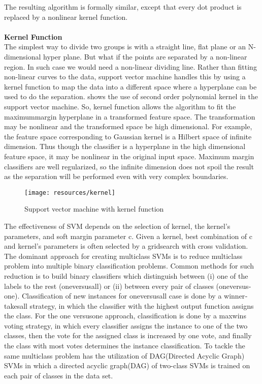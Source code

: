 {The resulting algorithm is formally similar, except that every dot product is replaced by a nonlinear kernel 
function.\\
\\
\textbf{Kernel Function}\\
The simplest way to divide two groups is with a straight line, flat plane or an N-dimensional hyper plane.
But what if the points are separated by a non-linear region. In such case we would need a non-linear dividing line. Rather than fitting
non-linear curves to the data, support vector machine handles this by using a kernel function to map the data into a different space where
a hyperplane can be used to do the separation. \cite{Anglade2010} shows the use of second order polynomial kernel in the support vector machine.
So, kernel function allows the algorithm to fit the maximum­margin hyperplane in a transformed
feature space. The transformation may be nonlinear and the transformed space be high dimensional. For example, the 
feature space corresponding to Gaussian kernel is a Hilbert space of infinite dimension. Thus though the 
classifier is a hyperplane in the high dimensional feature space, it may be nonlinear in the original input 
space. Maximum margin classifiers are well regularized, so the infinite dimension does not spoil the 
result as the separation will be performed even with very complex boundaries.\\

\begin{figure}[h]
        \texttt{[image: resources/kernel]}
        \caption{Support vector machine with kernel function}
\end{figure}
\vspace{15mm}
The effectiveness of SVM depends on the selection of kernel, the kernel’s parameters, and soft 
margin parameter c. Given a kernel, best combination of c and kernel’s parameters is often selected by a 
grid­search with cross validation. 
The dominant approach for creating multiclass SVMs is to reduce multi­class problem into 
multiple binary classification problems. Common methods for such reduction is to build binary classifiers 
which distinguish between (i) one of the labels to the rest (one­versus­all) or (ii) between every pair of 
classes (one­versus­one). Classification of new instances for one­versus­all case is done by a 
winner­takes­all strategy, in which the classifier with the highest output function assigns the class. For the 
one ­versus­one approach, classification is done by a max­wins voting strategy, in which every classifier 
assigns the instance to one of the two classes, then the vote for the assigned class is increased by one vote, 
and finally the class with most votes determines the instance classification. To tackle the same multiclass problem \cite{Haggblade2011} has the  
utilization of DAG(Directed Acyclic Graph) SVMs in which a directed acyclic graph(DAG) of two-class SVMs is trained on each pair of classes in the data set.

}
